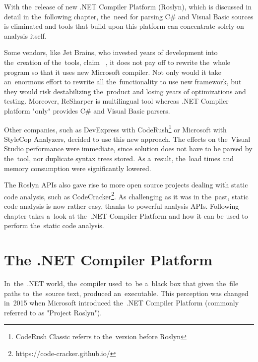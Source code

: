 \documentclass[
  digital, %
  table,   %
  lof,     %
  lot,     %
  oneside,
]{fithesis3}
\begin{document}
With the~release of new .NET Compiler Platform (Roslyn), which is discussed in detail in the~following chapter, the~need for parsing C\# and Visual Basic sources is eliminated and tools that build upon this platform can concentrate solely on analysis itself.

Some vendors, like Jet Brains, who invested years of development into the~creation of the~tools, claim ~\cite{resharper-and-roslyn-qa}, it does not pay off to rewrite the~whole program so that it uses new Microsoft compiler. Not only would it take an~enormous effort to rewrite all the~functionality to use new framework, but they would risk destabilizing the~product and losing years of optimizations and testing. Moreover, ReSharper is multilingual tool whereas .NET Compiler platform "only" provides C\# and Visual Basic parsers.

Other companies, such as DevExpress with CodeRush\footnote{CodeRush Classic referrs to the~version before Roslyn} or Microsoft with StyleCop Analyzers, decided to use this new approach. The effects on the~Visual Studio performance were immediate, since solution does not have to be parsed by the~tool, nor duplicate syntax trees stored. As a~result, the~load times and memory consumption were significantly lowered.

The Roslyn APIs also gave rise to more open source projects dealing with static code analysis, such as CodeCracker\footnote{https://code-cracker.github.io/}. As challenging as it was in the~past, static code analysis is now rather easy, thanks to powerful analysis APIs. Following chapter takes a~look at the~.NET Compiler Platform and how it can be used to perform the~static code analysis.

\chapter{The .NET Compiler Platform}
In~the~.NET world, the~compiler used~to~be a~black box that given the~file paths to~the~source text, produced an~executable. This perception was changed in~2015 when Microsoft introduced the~.NET Compiler Platform (commonly referred to as "Project Roslyn").  

\end{document}
